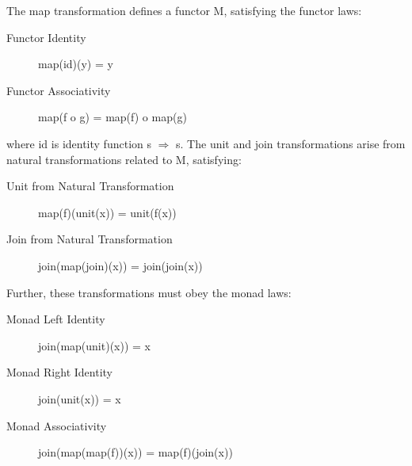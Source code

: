 \documentclass[runningheads]{llncs}
\begin{document}
The map transformation defines a functor M, satisfying the functor laws:
\begin{description}
\item[Functor Identity] map(id)(y) = y
\item[Functor Associativity] map(f o g) = map(f) o map(g)
\end{description}
where id is identity function s $\Rightarrow$ s.
The unit and join transformations arise from natural transformations related to M, satisfying:
\begin{description}
\item[Unit from Natural Transformation] map(f)(unit(x)) = unit(f(x))
\item[Join from Natural Transformation] join(map(join)(x)) = join(join(x))
\end{description}

Further, these transformations must obey the monad laws:
\begin{description}
\item[Monad Left Identity] join(map(unit)(x)) = x
\item[Monad Right Identity] join(unit(x)) = x
\item[Monad Associativity] join(map(map(f))(x)) = map(f)(join(x))
\end{description}
\end{document}
